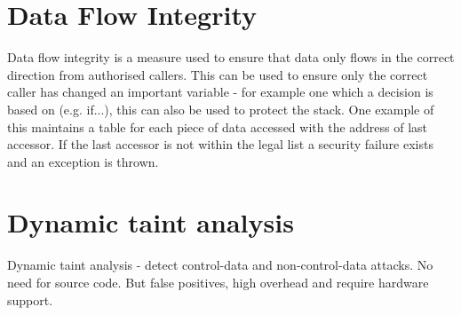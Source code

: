 \section{Data Flow Integrity}

Data flow integrity is a measure used to ensure that data only flows in the correct direction from authorised callers. This can be used to ensure only the correct caller has changed an important variable - for example one which a decision is based on (e.g. if...), this can also be used to protect the stack.
One example of this maintains a table for each piece of data accessed with the address of last accessor. If the last accessor is not within the legal list a security failure exists and an exception is thrown.

\section{Dynamic taint analysis}

Dynamic taint analysis - detect control-data and non-control-data attacks. No need for source code. But false positives, high overhead and require hardware support.
